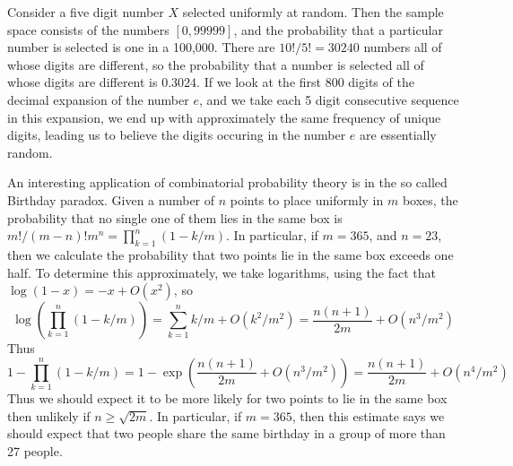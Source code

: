 \begin{example}
    Consider a five digit number $X$ selected uniformly at random. Then the sample space consists of the numbers $[0,99999]$, and the probability that a particular number is selected is one in a 100,000. There are $10!/5! = 30240$ numbers all of whose digits are different, so the probability that a number is selected all of whose digits are different is $0.3024$. If we look at the first 800 digits of the decimal expansion of the number $e$, and we take each 5 digit consecutive sequence in this expansion, we end up with approximately the same frequency of unique digits, leading us to believe the digits occuring in the number $e$ are essentially random.
\end{example}

\begin{example}
    An interesting application of combinatorial probability theory is in the so called Birthday paradox. Given a number of $n$ points to place uniformly in $m$ boxes, the probability that no single one of them lies in the same box is $m!/(m-n)!m^n = \prod_{k = 1}^n (1 - k/m)$. In particular, if $m = 365$, and $n = 23$, then we calculate the probability that two points lie in the same box exceeds one half. To determine this approximately, we take logarithms, using the fact that $\log(1 - x) = -x + O(x^2)$, so
    \[ \log \left( \prod_{k = 1}^n (1 - k/m) \right) = \sum_{k = 1}^n k/m + O(k^2/m^2) = \frac{n(n+1)}{2m} + O(n^3/m^2) \]
    Thus
    \[ 1 - \prod_{k = 1}^n (1 - k/m) = 1 - \exp \left( \frac{n(n+1)}{2m} + O(n^3/m^2) \right) = \frac{n(n+1)}{2m} + O(n^4/m^2) \]
    Thus we should expect it to be more likely for two points to lie in the same box then unlikely if $n \geq \sqrt{2m}$. In particular, if $m = 365$, then this estimate says we should expect that two people share the same birthday in a group of more than 27 people.
\end{example}

